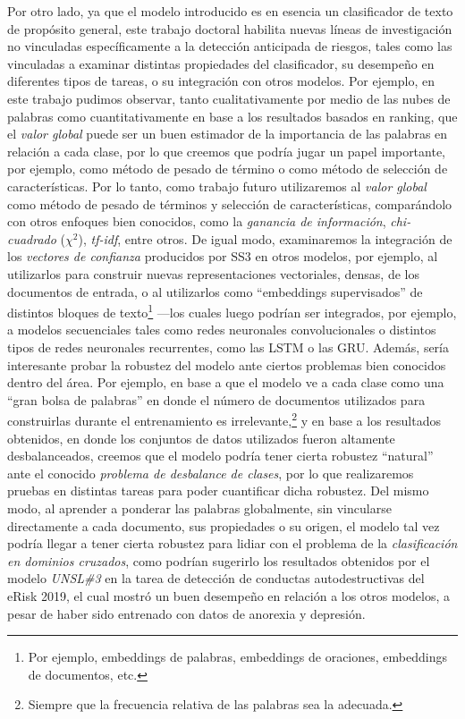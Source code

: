 Por otro lado, ya que el modelo introducido es en esencia un clasificador de texto de propósito general, este trabajo doctoral habilita nuevas líneas de investigación no vinculadas específicamente a la detección anticipada de riesgos, tales como las vinculadas a examinar distintas propiedades del clasificador, su desempeño en diferentes tipos de tareas, o su integración con otros modelos.
Por ejemplo, en este trabajo pudimos observar, tanto cualitativamente por medio de las nubes de palabras como cuantitativamente en base a los resultados basados en ranking, que el \emph{valor global} puede ser un buen estimador de la importancia de las palabras en relación a cada clase, por lo que creemos que podría jugar un papel importante, por ejemplo, como método de pesado de término o como método de selección de características. Por lo tanto, como trabajo futuro utilizaremos al \emph{valor global} como método de pesado de términos y selección de características, comparándolo con otros enfoques bien conocidos, como la \emph{ganancia de información}, \emph{chi-cuadrado} ($\chi^2$), \emph{tf-idf}, entre otros.
De igual modo, examinaremos la integración de los \emph{vectores de confianza} producidos por SS3 en otros modelos, por ejemplo, al utilizarlos para construir nuevas representaciones vectoriales, densas, de los documentos de entrada, o al utilizarlos como ``embeddings supervisados'' de distintos bloques de texto\footnote{Por ejemplo, embeddings de palabras, embeddings de oraciones, embeddings de documentos, etc.} ---los cuales luego podrían ser integrados, por ejemplo, a modelos secuenciales tales como redes neuronales convolucionales o distintos tipos de redes neuronales recurrentes, como las LSTM o las GRU.
Además, sería interesante probar la robustez del modelo ante ciertos problemas bien conocidos dentro del área.
Por ejemplo, en base a que el modelo ve a cada clase como una ``gran bolsa de palabras'' en donde el número de documentos utilizados para construirlas durante el entrenamiento es irrelevante,\footnote{Siempre que la frecuencia relativa de las palabras sea la adecuada.} y en base a los resultados obtenidos, en donde los conjuntos de datos utilizados fueron altamente desbalanceados, creemos que el modelo podría tener cierta robustez ``natural'' ante el conocido \emph{problema de desbalance de clases}, por lo que realizaremos pruebas en distintas tareas para poder cuantificar dicha robustez.
Del mismo modo, al aprender a ponderar las palabras globalmente, sin vincularse directamente a cada documento, sus propiedades o su origen, el modelo tal vez podría llegar a tener cierta robustez para lidiar con el problema de la \emph{clasificación en dominios cruzados}, como podrían sugerirlo los resultados obtenidos por el modelo \emph{UNSL\#3} en la tarea de detección de conductas autodestructivas del eRisk 2019, el cual mostró un buen desempeño en relación a los otros modelos, a pesar de haber sido entrenado con datos de anorexia y depresión.
